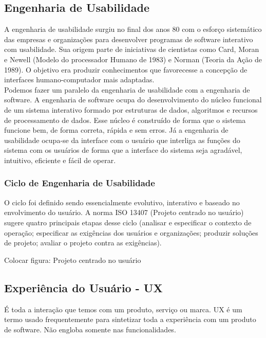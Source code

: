 \subsection{Engenharia de Usabilidade}

A engenharia de usabilidade surgiu no final dos anos 80 com o esforço sistemático das empresas e organizações para desenvolver programas de software interativo com usabilidade. Sua origem parte de iniciativas de cientistas como Card, Moran e Newell (Modelo do processador Humano de 1983) e Norman (Teoria da Ação de 1989). O objetivo era produzir conhecimentos que favorecesse a concepção de interfaces humano-computador mais adaptadas. ~\cite{cybis2010}
\\
Podemos fazer um paralelo da engenharia de usabilidade com a engenharia de software. A engenharia de software ocupa do desenvolvimento do núcleo funcional de um sistema interativo formado por estruturas de dados, algoritmos e recursos de processamento de dados. Esse núcleo é construído de forma que o sistema funcione bem, de forma correta, rápida e sem erros. Já a engenharia de usabilidade ocupa-se da interface com o usuário que interliga as funções do sistema com os usuários de forma que a interface do sistema seja agradável, intuitivo, eficiente e fácil de operar.~\cite{cybis2010}

\subsubsection{Ciclo de Engenharia de Usabilidade}

	O ciclo foi definido sendo essencialmente evolutivo, interativo e baseado no envolvimento do usuário. A norma ISO 13407 (Projeto centrado no usuário) sugere quatro principais etapas desse ciclo (analisar e especificar o contexto de operação; especificar as exigências dos usuários e organizações; produzir soluções de projeto; avaliar o projeto contra as exigências). ~\cite{cybis2010}

Colocar figura: Projeto centrado no usuário

\subsection{Experiência do Usuário - UX}
É toda a interação que temos com um produto, serviço ou marca.
UX é um termo usado frequentemente para sintetizar toda a experiência com um produto de software. Não engloba  somente nas funcionalidades. ~\cite{travis2013}


